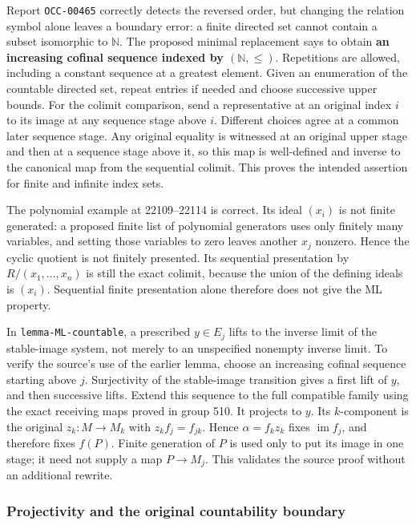 Report \texttt{OCC-00465} correctly detects the reversed order, but changing the relation symbol alone leaves a boundary error: a finite directed set cannot contain a subset isomorphic to \(\mathbb N\). The proposed minimal replacement says to obtain \textbf{an increasing cofinal sequence indexed by \((\mathbb N,\leq)\)}. Repetitions are allowed, including a constant sequence at a greatest element. Given an enumeration of the countable directed set, repeat entries if needed and choose successive upper bounds. For the colimit comparison, send a representative at an original index \(i\) to its image at any sequence stage above \(i\). Different choices agree at a common later sequence stage. Any original equality is witnessed at an original upper stage and then at a sequence stage above it, so this map is well-defined and inverse to the canonical map from the sequential colimit. This proves the intended assertion for finite and infinite index sets.

The polynomial example at 22109--22114 is correct. Its ideal \((x_i)\) is not finite generated: a proposed finite list of polynomial generators uses only finitely many variables, and setting those variables to zero leaves another \(x_j\) nonzero. Hence the cyclic quotient is not finitely presented. Its sequential presentation by \(R/(x_1,\ldots,x_n)\) is still the exact colimit, because the union of the defining ideals is \((x_i)\). Sequential finite presentation alone therefore does not give the ML property.

In \texttt{lemma-\AlgebraIdentifierBreak{}ML-\AlgebraIdentifierBreak{}countable}, a prescribed \(y\in E_j\) lifts to the inverse limit of the stable-image system, not merely to an unspecified nonempty inverse limit. To verify the source's use of the earlier lemma, choose an increasing cofinal sequence starting above \(j\). Surjectivity of the stable-image transition gives a first lift of \(y\), and then successive lifts. Extend this sequence to the full compatible family using the exact receiving maps proved in group 510. It projects to \(y\). Its \(k\)-component is the original \(z_k:M\to M_k\) with \(z_k f_j=f_{jk}\). Hence \(\alpha=f_kz_k\) fixes \(\operatorname{im}f_j\), and therefore fixes \(f(P)\). Finite generation of \(P\) is used only to put its image in one stage; it need not supply a map \(P\to M_j\). This validates the source proof without an additional rewrite.

\subsubsection{Projectivity and the original countability boundary}\label{algebra-proof-013-projectivity-and-the-original-countability-boundary}

